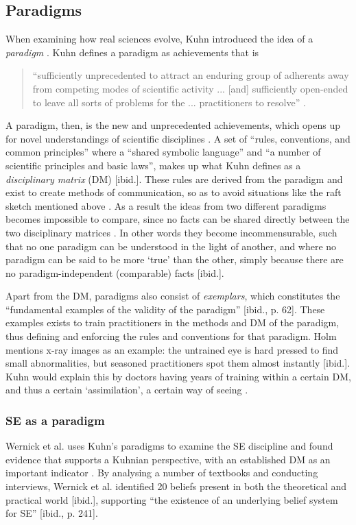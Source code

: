 \documentclass{article}
\begin{document}
\subsection{Paradigms} \label{Theory:Paradigms}
When examining how real sciences evolve, Kuhn introduced the idea of a \textit{paradigm} \citep[p. 59]{Holm:2014}. Kuhn defines a paradigm as achievements that is
\begin{quote}
``sufficiently unprecedented to attract an enduring group of adherents away from competing modes of scientific activity ... [and] sufficiently open-ended to leave all sorts of problems for the ... practitioners to resolve'' \citep[p. 10-11]{Kuhn:2012}.
\end{quote}
A paradigm, then, is the new and unprecedented achievements, which opens up for novel understandings of scientific disciplines \citep[p. 61]{Holm:2014}.
A set of ``rules, conventions, and common principles'' where a ``shared symbolic language'' and ``a number of scientific principles and basic laws'', makes up what Kuhn defines as a \textit{disciplinary matrix} (DM) [ibid.]. These rules are derived from the paradigm and exist to create methods of communication, so as to avoid situations like the raft sketch mentioned above \citep[p. 181]{Kuhn:2012}. As a result the ideas from two different paradigms becomes impossible to compare, since no facts can be shared directly between the two disciplinary matrices \citep[p. 66]{Holm:2014}. In other words they become incommensurable, such that no one paradigm can be understood in the light of another, and where no paradigm can be said to be more `true' than the other, simply because there are no paradigm-independent (comparable) facts [ibid.].

Apart from the DM, paradigms also consist of \textit{exemplars}, which constitutes the ``fundamental examples of the validity of the paradigm'' [ibid., p. 62]. These examples exists to train practitioners in the methods and DM of the paradigm, thus defining and enforcing the rules and conventions for that paradigm. Holm mentions x-ray images as an example: the untrained eye is hard pressed to find small abnormalities, but seasoned practitioners spot them almost instantly [ibid.]. Kuhn would explain this by doctors having years of training within a certain DM, and thus a certain `assimilation', a certain way of seeing \citep[p. 189]{Kuhn:2012}.

\subsubsection{SE as a paradigm}
Wernick et al. uses Kuhn's paradigms to examine the SE discipline and found evidence that supports a Kuhnian perspective, with an established DM as an important indicator \citep[p. 240]{Wernick:2004}. By analysing a number of textbooks and conducting interviews, Wernick et al. identified 20 beliefs present in both the theoretical and practical world [ibid.], supporting ``the existence of an underlying belief system for SE'' [ibid., p. 241].
\end{document}
